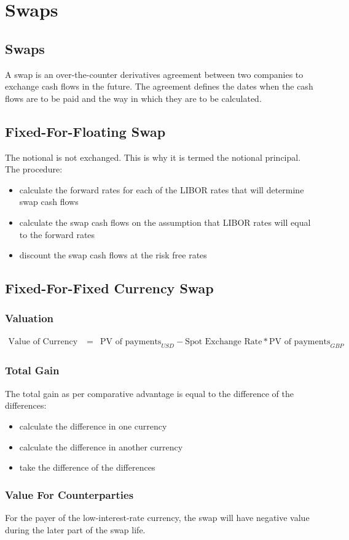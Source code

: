 \chapter{Swaps}

\section{Swaps}
A swap is an over-the-counter derivatives agreement between two companies to exchange cash flows in the future. The agreement defines the dates when the cash flows are to be paid and the way in which they are to be calculated.


\section{Fixed-For-Floating Swap}
The notional is not exchanged. This is why it is termed the notional principal.\\
The procedure:
\begin{itemize}
	\item calculate the forward rates for each of the LIBOR rates that will determine swap cash flows
	\item calculate the swap cash flows on the assumption that LIBOR rates will equal to the forward rates
	\item discount the swap cash flows at the risk free rates
\end{itemize}

\section{Fixed-For-Fixed Currency Swap}

\subsection{Valuation}
\begin{eqnarray}
\nonumber
\text{Value of Currency Swap} &=& \text{PV of payments}_{USD} - \text{Spot Exchange Rate} * \text{PV of payments}_{GBP}
\end{eqnarray}

\subsection{Total Gain}
The total gain as per comparative advantage is equal to the difference of the differences:
\begin{itemize}
	\item calculate the difference in one currency
	\item calculate the difference in another currency
	\item take the difference of the differences
\end{itemize}

\subsection{Value For Counterparties}
For the payer of the low-interest-rate currency, the swap will have negative value during the later part of the swap life.